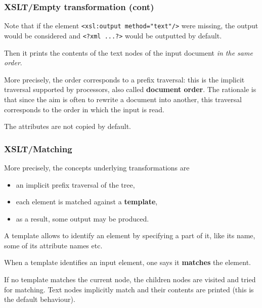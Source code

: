%
\begin{frame}[containsverbatim]
\frametitle{XSLT/Empty transformation (cont)}

Note that if the element \verb|<xsl:output method="text"/>| were
missing, the output would be considered \XML and \verb|<?xml ...?>|
would be outputted by default.

\bigskip

Then it prints the contents of the text nodes of the input \XML
document \emph{in the same order}.

\bigskip

More precisely, the order corresponds to a prefix traversal: this is
the implicit traversal supported by \XSLT processors, also called
\textbf{document order}. The rationale is that since the aim is often
to rewrite a document into another, this traversal corresponds to the
order in which the input is read.

\bigskip

The attributes are not copied by default.

\end{frame}

%
\begin{frame}
\frametitle{XSLT/Matching}

More precisely, the concepts underlying \XSLT transformations are
\begin{itemize}

  \item an implicit prefix traversal of the \XML tree,

  \item each element is matched against a \textbf{template},

  \item as a result, some output may be produced.

\end{itemize}
A template allows to identify an element by specifying a part of it,
like its name, some of its attribute names etc.

\bigskip

When a template identifies an input element, one says it
\textbf{matches} the element.

\bigskip

If no template matches the current node, the children nodes are
visited and tried for matching. Text nodes implicitly match and their
contents are printed (this is the default behaviour).

\end{frame}

